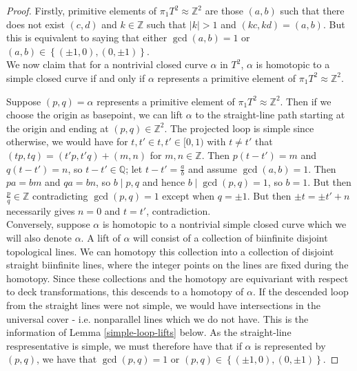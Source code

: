 \documentclass[reqno]{amsart}
\theoremstyle{definition}
\theoremstyle{remark}
\begin{document}
\begin{proof}
    Firstly, primitive elements
    of $\pi_1 T^2 \approx \mathbb{Z}^2$ are those
    $\left( a,b \right) $ such that there
    does not exist $(c,d)$ and $k \in \mathbb{Z}$ such that
    $\left| k \right| >1$ and $\left( kc,kd \right) =
    \left( a,b \right) $. But this is equivalent to saying that
    either $\gcd (a,b) = 1$ or $\left( a,b \right) 
    \in \left\{ \left( \pm 1,0 \right) ,
    \left( 0, \pm 1 \right) \right\} $.\\
    
    We now claim that for a nontrivial closed curve $\alpha$ in $T^2$,
    $\alpha$ is homotopic to a simple closed curve if and only
    if $\alpha$ represents a primitive element of
    $\pi_1 T^2 \approx \mathbb{Z}^2$.

    Suppose $ (p,q) = \alpha$ represents a primitive element of
    $\pi_1 T^2 \approx \mathbb{Z}^2$. Then if we choose
    the origin as basepoint, we can lift  $\alpha$ to
    the straight-line path starting at the origin and 
    ending at $\left( p,q \right)  \in \mathbb{Z}^2$. 
    The projected loop is simple since otherwise,
    we would have for $t,t' \in t,t' \in [0,1) $ with
    $t \neq t'$ that
    $\left( tp,tq \right) = \left( t'p,t'q \right) +
    \left( m,n \right) $ for $m,n \in \mathbb{Z}$.
    Then $p \left( t-t' \right) = m$ and
    $q \left( t-t' \right) = n$, so
    $t-t' \in \mathbb{Q}$; let $t-t' = \frac{a}{b}$ and
    assume $\gcd \left( a,b \right) = 1$. Then
    $pa = bm$ and $qa = bn$, so
    $b  \mid p,q$ and hence $b  \mid \gcd(p,q) = 1$, so
    $b = 1$.
    But then $\frac{p}{q} \in \mathbb{Z}$ contradicting
    $\gcd \left( p,q \right) = 1$ except when
    $q = \pm 1$. But then $\pm t = \pm t' + n$ necessarily
    gives $n = 0$ and $t = t'$, contradiction.\\
    \linebreak
    Conversely, suppose $\alpha$ is homotopic to
    a nontrivial simple closed curve which we will also
    denote $\alpha$. A lift of $\alpha$ will consist
    of a collection of biinfinite disjoint topological lines.
    We can homotopy this collection into a collection of disjoint
    straight biinfinite lines, where the integer points on
    the lines are fixed during the homotopy. 
    Since these collections and the homotopy are equivariant
    with respect to deck transformations, this descends
    to a homotopy of $\alpha$. If the descended loop
    from the straight lines were not simple, we would
    have intersections in the universal cover - i.e. nonparallel
    lines which we do not have. This is the information of
    Lemma \ref{simple-loop-lifts} below.
    As the straight-line respresentative is simple, we
    must therefore have that if $\alpha$ is represented by
    $\left( p,q \right) $, we have that
    $ \gcd \left( p,q \right) = 1$ or
    $\left( p,q \right) \in \left\{ \left( \pm 1,0 \right) ,
    \left( 0, \pm 1 \right) \right\} $.
\end{proof}
\end{document}
